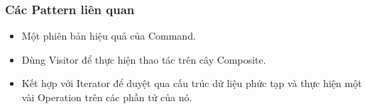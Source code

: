 \subsubsection{Các Pattern liên quan}
\begin{itemize}
    \item Một phiên bản hiệu quả của Command.
    \item Dùng Visitor để thực hiện thao tác trên cây Composite.
    \item Kết hợp với Iterator để duyệt qua cấu trúc dữ liệu phức tạp và thực hiện một vài Operation trên các phần tử của nó.
\end{itemize}